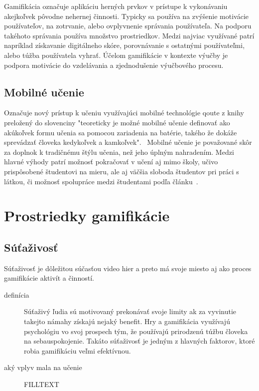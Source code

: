 \documentclass[10pt,slovak,a4paper]{article}
\begin{document}
Gamifikácia označuje aplikáciu herných prvkov v prístupe k vykonávaniu akejkoľvek pôvodne nehernej činnosti. Typicky sa používa na zvýšenie motivácie používateľov, na zotrvanie, alebo ovplyvnenie správania používateľa. Na podporu takéhoto správania používa množstvo prostriedkov. Medzi najviac využívané patrí napríklad získavanie digitálneho skóre, porovnávanie s ostatnými používateľmi, alebo túžba používatela vyhrať. Účelom gamifikácie v kontexte výučby je podpora motivácie do vzdelávania a zjednodušenie výučbového procesu.


\subsection{Mobilné učenie} \label{mobilelearning}

Označuje nový prístup k učeniu využívajúci mobilné technológie qoute z knihy preložený do slovenciny "teoreticky je možné mobilné učenie definovať ako akúkoľvek formu učenia sa pomocou zariadenia na batérie, takého že dokáže sprevádzať človeka kedykoľvek a kamkoľvek".~\cite{deMoraesSarmentoRego2015}
Mobilné učenie je považované skôr za doplnok k tradičnému štýlu učenia, než jeho úplným nahradením. Medzi hlavné výhody patrí možnosť pokračovať v učení aj mimo školy, učivo prispôsobené študentovi na mieru, ale aj väčšia sloboda študentov pri práci s látkou, či možnosť spolupráce medzi študentami podľa článku~\cite{deMoraesSarmentoRego2015}.


\section{Prostriedky gamifikácie}

\subsection{Súťaživosť} \label{competitiveness}
Súťaživosť je dôležitou súčasťou video hier a preto má svoje miesto aj ako proces gamifikácie aktivít a činností.
\begin{description}
    \item [definícia]
          Súťaživý ľudia sú motivovaný prekonávať svoje limity ak za vyvinutie takejto námahy získajú nejaký benefit. Hry a gamifikácia využívajú psychológiu vo svoj prospech tým, že používajú prirodzenú túžbu človeka na sebauspokojenie. Takáto súťaživosť je jedným z hlavných faktorov, ktoré robia gamifikáciu veľmi efektívnou.

    \item [aký vplyv mala na učenie] FILLTEXT
\end{description}
\end{document}
